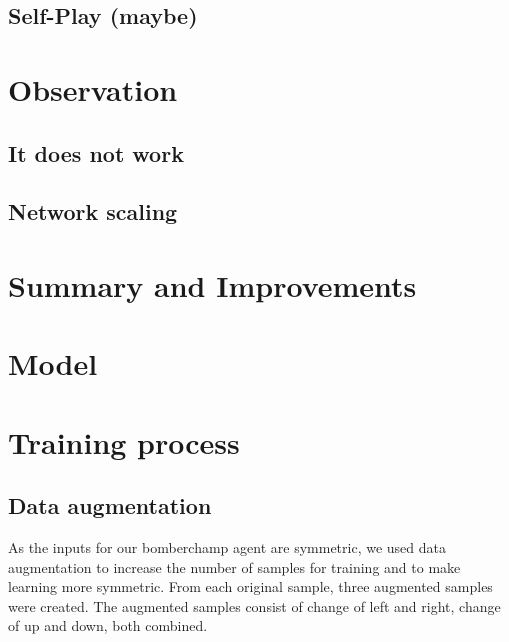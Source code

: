 \documentclass[12pt]{article}
\begin{document}
\subsection{Self-Play (maybe)}

\section{Observation}
\subsection{It does not work}
\subsection{Network scaling} %



\section{Summary and Improvements}






\section{Model}



\section{Training process}

\subsection{Data augmentation}
As the inputs for our bomberchamp agent are symmetric, we used data augmentation to increase the number of samples for training and to make learning more symmetric.
From each original sample, three augmented samples were created. The augmented samples consist of change of left and right, change of up and down, both combined.
\end{document}
